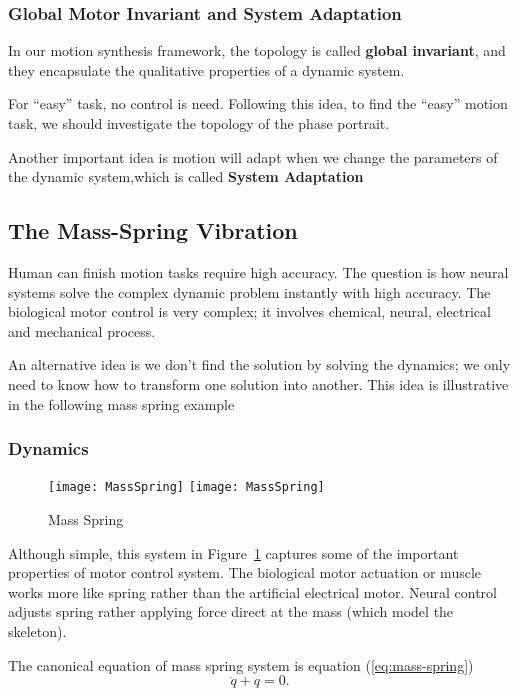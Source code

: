 \subsubsection*{Global Motor Invariant and System Adaptation}
In our motion synthesis framework, the topology is called \textbf{global invariant}, and they encapsulate the qualitative properties of a dynamic system.

For “easy” task, no control is need.
Following this idea, to find the “easy” motion task, we should investigate the topology of the phase portrait.

Another important idea is motion will adapt when we change the parameters of the dynamic system,which is called \textbf{System Adaptation}


\subsection{The Mass-Spring Vibration}
Human can finish motion tasks require high accuracy.
The question is how neural systems solve the complex dynamic problem instantly with high accuracy.
The biological motor control is very complex; it involves chemical, neural, electrical and mechanical process. 

An alternative idea is we don’t find the solution by solving the dynamics; we only need to know how to transform one solution into another.
This idea is illustrative in the following mass spring example

\subsubsection*{Dynamics}

\begin{figure}[!htbp]
  \begin{center}
    \leavevmode
    \ifpdf
      \texttt{[image: MassSpring]}
    \else
      \texttt{[image: MassSpring]}
    \fi
    \caption{Mass Spring}
    \label{fig:massspring}
  \end{center}
\end{figure}
Although simple, this system in Figure~\ref{fig:massspring} captures some of the important properties of motor control system.
The biological motor actuation or muscle works more like spring rather than the artificial electrical motor. 
Neural control adjusts spring rather applying force direct at the mass (which model the skeleton).


The canonical equation of mass spring system is equation (\ref{eq:mass-spring})
\begin{equation}
\label{eq:mass-spring}
\ddot{q}+q=0.
\end{equation}


